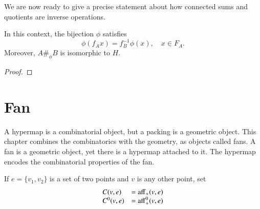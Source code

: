 We are now ready to give a precise statement about how connected sums and quotients are inverse operations.

\begin{lemma}
In this context, the bijection $\phi$ satisfies 
   $$\phi(f_A x) = f_B^{-1} \phi(x),\quad x\in F_A.$$
Moreover, $A\#_\phi B$ is isomorphic to $H$.
\end{lemma}

\begin{proof}
\end{proof}






\chapter{Fan}

A hypermap is a combinatorial object, but a packing
is a geometric object.  This chapter combines the combinatorics
with the geometry, as objects called fans.  A fan is a geometric
object, yet there is a hypermap attached to it.
The hypermap encodes the combinatorial properties of the fan.



If $e=\{v_1,v_2\}$ is a set of two points and $v$ is any other point,
set
  $$
  \begin{array}{lll}
  C(v,e) &= {\operatorname{aff}}_+(v,e)\\
  C^0(v,e) &= {\operatorname{aff}}^0_+(v,e)\\
  \end{array}
  $$

